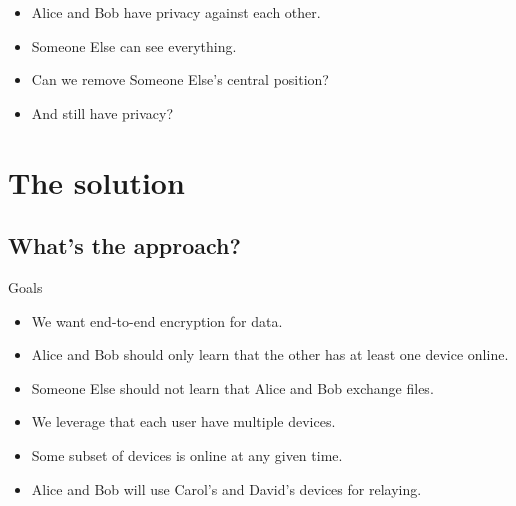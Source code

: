 \begin{frame}
  \begin{remark}
    \begin{itemize}
      \item Alice and Bob have privacy against each other.
      \item Someone Else can see everything.
    \end{itemize}
  \end{remark}

  \pause

  \begin{question}
    \begin{itemize}
      \item Can we remove Someone Else's central position?
      \item And still have privacy?
    \end{itemize}
  \end{question}
\end{frame}


\section{The solution}

\subsection{What's the approach?}

\begin{frame}
  \begin{block}{Goals}
  \begin{itemize}
    \item We want end-to-end encryption for data.
    \item Alice and Bob should only learn that the other has at least one 
      device online.
    \item Someone Else should not learn that Alice and Bob exchange files.
    \end{itemize}
  \end{block}
\end{frame}

\begin{frame}
  \begin{idea}
    \begin{itemize}
      \item We leverage that each user have multiple devices.
      \item Some subset of devices is online at any given time.
      \item Alice and Bob will use Carol's and David's devices for relaying.
    \end{itemize}
  \end{idea}
\end{frame}

